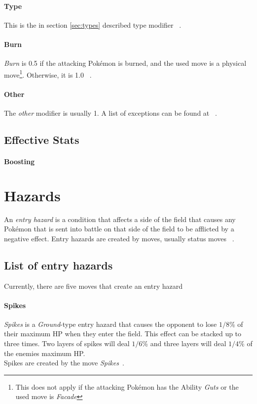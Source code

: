 \paragraph{Type}
This is the in section \ref{sec:types} described type modifier ~\autocite{Bulbapedia:Damage}.

\paragraph{Burn}
\textit{Burn} is 0.5 if the attacking Pokémon is burned, and the used move
is a physical move\footnote{This does not apply if the attacking Pokémon has the Ability \textit{Guts}
or the used move is \textit{Facade}}. Otherwise, it is 1.0 ~\autocite{Bulbapedia:Damage}.

\paragraph{Other}
The \textit{other} modifier is usually 1. A list of exceptions can be found at ~\autocite{Bulbapedia:Damage}.

\subsection{Effective Stats}
\paragraph{Boosting}
\label{sec:boosting}

\section{Hazards}
\label{sec:hazards}
An \textit{entry hazard} is a condition that affects a side of the field that causes
any Pokémon that is sent into battle on that side of the field to be afflicted by 
a negative effect. Entry hazards are created by moves, usually status moves
~\autocite{Bulbapedia:EntryHazards}. \\
\subsection{List of entry hazards}
Currently, there are five moves that create an entry hazard

\paragraph{Spikes}
\textit{Spikes} is a \textit{Ground}-type entry hazard that causes the opponent
to lose $1/8$\% of their maximum \ac{HP} when they enter the field. This
effect can be stacked up to three times. Two layers of spikes will deal
$1/6$\% and three layers will deal $1/4$\% of the enemies maximum \ac{HP}. \\
Spikes are created by the move \textit{Spikes}~\autocite{Bulbapedia:Spikes}.

